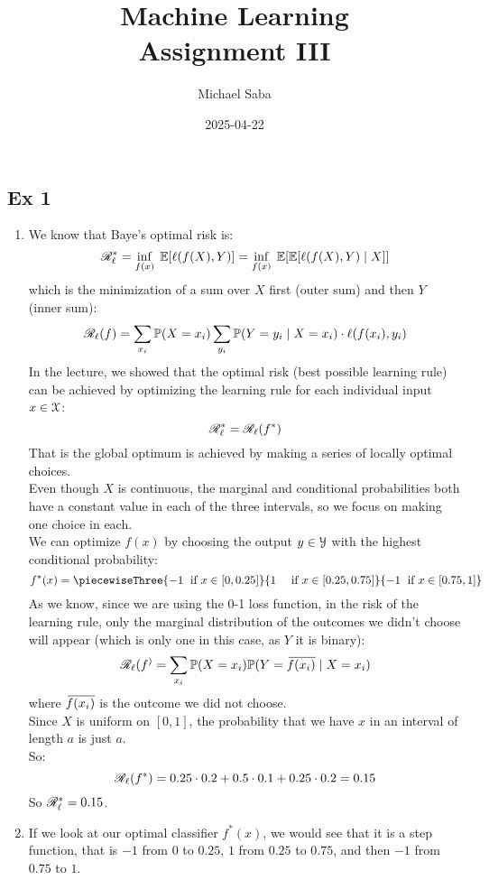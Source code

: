 \documentclass[12pt]{article}
\title{%
    \Huge Machine Learning \\
    \Large Assignment III
}
\date{2025-04-22}
\author{Michael Saba}
\begin{document}
\maketitle
\newpage
\setlength{\parindent}{0pt}

\subsection*{Ex 1}
\begin{enumerate}[label = \alph*)]
\item 
We know that Baye's optimal risk is:
\[ \mathscr{R}_\ell^*
= \inf_{f(x)} \; \mathbb{E}[\ell(f(X), Y)] 
= \inf_{f(x)} \; 
\mathbb{E}[\mathbb{E}[\ell(f(X), Y) \mid X]] \]
which is the minimization of 
a sum over $X$ first (outer sum)
and then $Y$ (inner sum):
\[ \mathscr{R}_\ell(f)
= \sum_{x_i} \mathbb{P}(X = x_i)
\sum_{y_i} \mathbb{P}(Y = y_i \mid X = x_i)
\cdot \ell(f(x_i), y_i) \]
In the lecture, we showed that the
optimal risk (best possible learning rule)
can be achieved by optimizing the
learning rule for each individual
input $x \in \mathcal{X}$:
\[ \mathscr{R}_\ell^* = \mathscr{R}_\ell(f^*) \]
That is
the global optimum is achieved
by making a series of locally optimal
choices. \\
Even though $X$ is continuous,
the marginal and conditional probabilities
both have a constant value in each
of the three intervals,
so we focus on making one choice in each. \\
We can optimize $f(x)$
by choosing the output $y \in \mathcal{Y}$
with the highest conditional
probability:
\[ f^*(x)
= \piecewiseThree
{-1 \; \text{ if } x \in [0, 0.25]}
{1 \quad \text{ if } x \in [0.25, 0.75]}
{-1 \; \text{ if } x \in [0.75, 1]} \]
As we know,
since we are using the 0-1 loss function,
in the risk of the learning rule,
only the marginal distribution
of the outcomes we didn't choose
will appear (which is only
one in this case, as $Y$ it is binary):
\[ \mathscr{R}_\ell(f^)
= \sum_{x_i} \mathbb{P}(X = x_i)
\mathbb{P}(Y = \,\overline{\!{f(x_i)}} \mid X = x_i) \]
where $\,\overline{\!{f(x_i)}}$
is the outcome we did not choose. \\
Since $X$ is uniform on $[0, 1]$,
the probability that we have
$x$ in an interval of length $a$
is just $a$. \\
So:
\[ \mathscr{R}_\ell(f^*) = 
0.25 \cdot 0.2 + 0.5 \cdot 0.1
+ 0.25 \cdot 0.2 = 0.15 \]
So $\mathscr{R}_\ell^* = 0.15$.
\item 
If we look at our optimal classifier 
$f^*(x)$, we would see that it is
a step function, that is $-1$
from $0$ to $0.25$,
$1$ from $0.25$ to $0.75$,
and then $-1$ from $0.75$ to $1$. \\

\end{enumerate}
\end{document}

